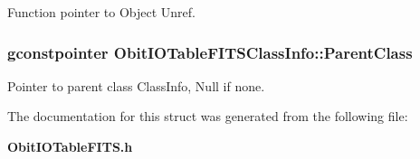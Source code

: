 Function pointer to Object Unref. 

\subsubsection{\setlength{\rightskip}{0pt plus 5cm}gconstpointer {\bf Obit\-IOTable\-FITSClass\-Info::Parent\-Class}}\label{structObitIOTableFITSClassInfo_o3}


Pointer to parent class Class\-Info, Null if none. 



The documentation for this struct was generated from the following file:\begin{CompactItemize}
\item 
{\bf Obit\-IOTable\-FITS.h}\end{CompactItemize}
